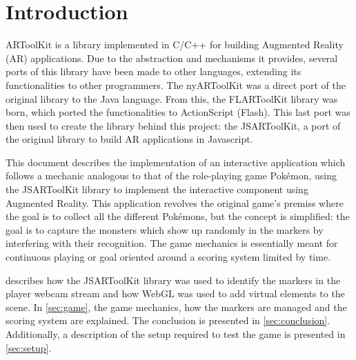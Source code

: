 \section{Introduction}
\label{sec:intro}

ARToolKit is a library implemented in C/C++ for building Augmented Reality (AR) applications. Due to the abstraction and mechanisms it provides, several ports of this library have been made to other languages, extending its functionalities to other programmers. The nyARToolKit was a direct port of the original library to the Java language. From this, the FLARToolKit library was born, which ported the functionalities to ActionScript (Flash). This last port was then used to create the library behind this project: the JSARToolKit, a port of the original library to build AR applications in Javascript.

This document describes the implementation of an interactive application which follows a mechanic analogous to that of the role-playing game Pokémon\textregistered, using the JSARToolKit library to implement the interactive component using Augmented Reality. This application revolves the original game's premiss where the goal is to collect all the different Pokémons, but the concept is simplified: the goal is to capture the monsters which show up randomly in the markers by interfering with their recognition. The game mechanics is essentially meant for continuous playing or goal oriented around a scoring system limited by time.

 describes how the JSARToolKit library was used to identify the markers in the player webcam stream and how WebGL was used to add virtual elements to the scene. In \cref{sec:game}, the game mechanics, how the markers are managed and the scoring system are explained. The conclusion is presented in \cref{sec:conclusion}. Additionally, a description of the setup required to test the game is presented in \cref{sec:setup}.